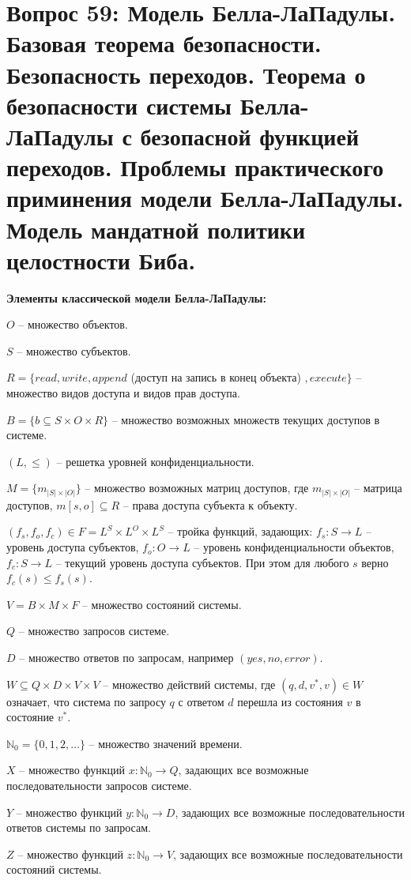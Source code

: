 \section{Вопрос 59: Модель Белла-ЛаПадулы. Базовая теорема безопасности. Безопасность переходов. Теорема о безопасности системы Белла-ЛаПадулы с безопасной функцией переходов. 
Проблемы практического приминения модели Белла-ЛаПадулы. Модель мандатной политики целостности Биба.}

\textbf{Элементы классической модели Белла-ЛаПадулы:}
\begin{enumerate*}
		\item $ O $ -- множество объектов.
		\item $S$ -- множество субъектов.
		\item $ R = \{ read, write, append$ (доступ на запись в конец объекта) $,execute\}$ -- множество видов доступа и видов прав доступа.
		\item $B = \{b \subseteq S \times O \times R\}$ -- множество возможных множеств текущих доступов в системе.
		\item $(L, \leqslant)$ -- решетка уровней конфиденциальности.
		\item $M=\{m_{|S| \times |O|}\}$ -- множество возможных матриц доступов, где $m_{|S| \times |O|}$ -- матрица доступов, $m[s,o] \subseteq R$ -- права доступа субъекта к объекту.
		\item $(f_s, f_o, f_c) \in F = L^S \times L^O \times L^S$ -- тройка функций, задающих: $f_s : S \to L$ -- уровень доступа субъектов, $f_o : O \to L$ -- уровень конфиденциальности объектов, 
			$f_c : S \to L$ -- текущий уровень доступа субъектов. При этом для любого $s$ верно $f_c(s) \leqslant f_s(s)$.
		\item $V = B \times M \times F$ -- множество состояний системы.
		\item $Q$ -- множество запросов системе.
		\item $D$ -- множество ответов по запросам, например $({yes, no, error})$.
		\item $W \subseteq Q \times D \times V \times V$ -- множество действий системы, где $(q, d, v^*, v) \in W$ означает, что система по запросу $q$ с ответом $d$ перешла из состояния $v$ в состояние $v^*$.
		\item $\mathbb{N}_0 = \{0, 1, 2, \ldots\}$ -- множество значений времени.
		\item $X$ -- множество функций $x:\mathbb{N}_0 \to Q$, задающих все возможные последовательности запросов системе.
		\item $Y$ -- множество функций $y:\mathbb{N}_0 \to D$, задающих все возможные последовательности ответов системы по запросам.
		\item $Z$ -- множество функций $z:\mathbb{N}_0 \to V$, задающих все возможные последовательности состояний системы.
\end{enumerate*}

